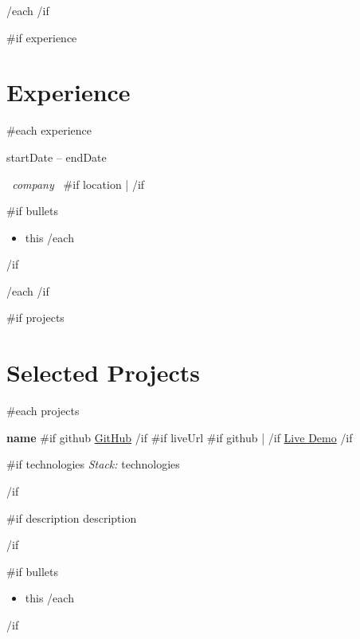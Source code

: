 \documentclass[10pt,a4paper]{article}
\begin{document}
\vspace{3pt}

{{/each}}
{{/if}}

{{#if experience}}
\section{Experience}

{{#each experience}}

\textbf{ }
\hfill
{\small\color{secondary}
{{startDate}} -- {{endDate}}
}
\par

{\small
\textit{ {{~company~}} }
{{#if location}}
\enspace | 
{{/if}}
}
\par

{{#if bullets}}
\begin{itemize}
    {{#each bullets}}
    \item {{this}}
    {{/each}}
\end{itemize}
{{/if}}

\vspace{3pt}

{{/each}}
{{/if}}

{{#if projects}}
\section{Selected Projects}

{{#each projects}}

\noindent
\textbf{\color{deepgreen}\normalsize {{name}} }
\hfill
{\small
{{#if github}}
\href{ {{~github~}} }{GitHub}
{{/if}}
{{#if liveUrl}}
{{#if github}}
\enspace | \enspace
{{/if}}
\href{ {{~liveUrl~}} }{Live Demo}
{{/if}}
}
\par

{{#if technologies}}
\vspace{2pt}
{\small\color{secondary}
\textit{Stack:} {{technologies}}
}
\par
{{/if}}

{{#if description}}
\vspace{2pt}
{{description}}
\par
{{/if}}

{{#if bullets}}
\begin{itemize}
    {{#each bullets}}
    \item {{this}}
    {{/each}}
\end{itemize}
{{/if}}
\end{document}
